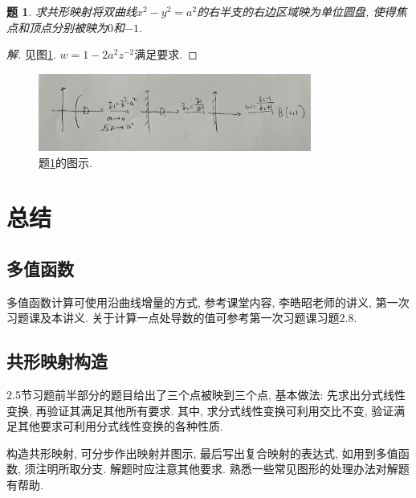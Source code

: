 \documentclass{article}[a4paper, 12pt]
\newtheorem{problem}{题}
\newenvironment{solution}{\begin{proof}[解]}{\end{proof}}
\begin{document}
\begin{problem}\label{supp1}
  求共形映射将双曲线\(x^2-y^2=a^2\)的右半支的右边区域映为单位圆盘, 使得焦点和顶点分别被映为\(0\)和\(-1\).
\end{problem}

\begin{solution}
  见图\ref{fig:supp1}. \(w=1-2a^2z^{-2}\)满足要求.
\end{solution}

\begin{figure}[htbp]
  \centering
  \includegraphics[width=0.8\textwidth]{images/supp1.jpg}
  \caption{题\ref{supp1}的图示.}
  \label{fig:supp1}
\end{figure}

\section{总结}

\subsection{多值函数}

多值函数计算可使用沿曲线增量的方式, 参考课堂内容, 李皓昭老师的讲义, 第一次习题课及本讲义. 关于计算一点处导数的值可参考第一次习题课习题2.8.

\subsection{共形映射构造}

2.5节习题前半部分的题目给出了三个点被映到三个点, 基本做法: 先求出分式线性变换, 再验证其满足其他所有要求. 其中, 求分式线性变换可利用交比不变, 验证满足其他要求可利用分式线性变换的各种性质.

构造共形映射, 可分步作出映射并图示, 最后写出复合映射的表达式, 如用到多值函数, 须注明所取分支. 解题时应注意其他要求. 熟悉一些常见图形的处理办法对解题有帮助.
\end{document}
